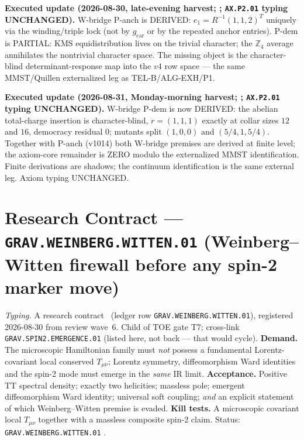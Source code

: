 \documentclass[11pt,a4paper]{article}
\begin{document}
\par\smallskip\noindent\textbf{Executed update (2026-08-30, late-evening harvest;
;
\texttt{AX.P2.01} typing UNCHANGED).}
W-bridge P-anch is DERIVED: $e_1=R^{-1}(1,1,2)^T$ uniquely via the winding/triple lock
(not by $g_{\mathrm{car}}$ or by the repeated anchor entries).  P-dem is PARTIAL: KMS
equidistribution lives on the trivial character; the $\mathbb Z_4$ average annihilates
the nontrivial character space.  The missing object is the character-blind
determinant-response map into the $v4$ row space --- the same MMST/Quillen externalized
leg as TEL-B/ALG-EXH/P1.

\par\smallskip\noindent\textbf{Executed update (2026-08-31, Monday-morning harvest;
;
\texttt{AX.P2.01} typing UNCHANGED).}
W-bridge P-dem is now DERIVED: the abelian total-charge insertion is character-blind,
$r=(1,1,1)$ exactly at collar sizes $12$ and $16$, democracy residual $0$; mutants split
$(1,0,0)$ and $(5/4,1,5/4)$.  Together with P-anch (v1014) both W-bridge premises are
derived at finite level; the axiom-core remainder is ZERO modulo the externalized MMST
identification.  Finite derivations are shadows; the continuum identification is the same
external leg.  Axiom typing UNCHANGED.

\section*{Research Contract --- \texttt{GRAV.WEINBERG.WITTEN.01} (Weinberg--Witten firewall before any spin-2 marker move)}
\noindent\emph{Typing.} A research contract \mO\ (ledger row
\texttt{GRAV.WEINBERG.WITTEN.01}), registered 2026-08-30 from review wave~6.
Child of TOE gate T7; cross-link \texttt{GRAV.SPIN2.EMERGENCE.01} (listed here, not back ---
that would cycle).  \textbf{Demand.}  The microscopic Hamiltonian family must \emph{not}
possess a fundamental Lorentz-covariant local conserved $T_{\mu\nu}$; Lorentz symmetry,
diffeomorphism Ward identities and the spin-2 mode must emerge in the \emph{same} IR limit.
\textbf{Acceptance.}  Positive TT spectral density; exactly two helicities; massless pole;
emergent diffeomorphism Ward identity; universal soft coupling; \emph{and} an explicit
statement of which Weinberg--Witten premise is evaded.  \textbf{Kill tests.}  A microscopic
covariant local $T_{\mu\nu}$ together with a massless composite spin-2 claim.
Status: \texttt{GRAV.WEINBERG.WITTEN.01} \mO.
\end{document}
